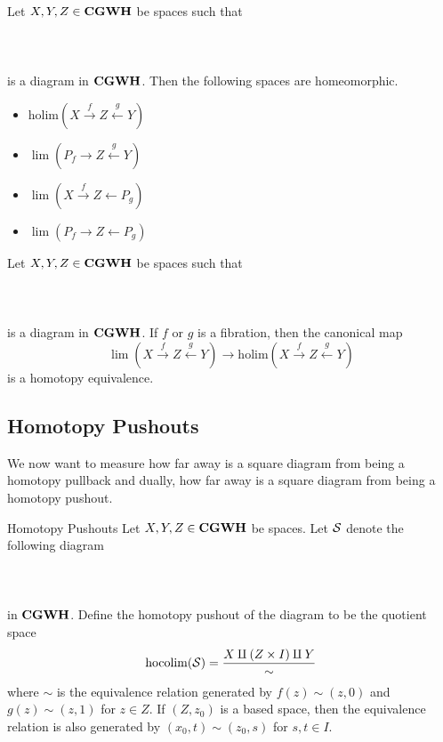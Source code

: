 \documentclass[a4paper]{article}
\begin{document}
\begin{prp}{}{} Let $X,Y,Z\in\bold{CGWH}$ be spaces such that \\~\\
\\~\\
is a diagram in $\bold{CGWH}$. Then the following spaces are homeomorphic. 
\begin{itemize}
\item $\text{holim}(X\overset{f}{\rightarrow}Z\overset{g}{\leftarrow}Y)$
\item $\lim(P_f\rightarrow Z\overset{g}{\leftarrow}Y)$
\item $\lim(X\overset{f}{\rightarrow}Z\leftarrow P_g)$
\item $\lim(P_f\rightarrow Z\leftarrow P_g)$
\end{itemize}
\end{prp}

\begin{prp}{}{} Let $X,Y,Z\in\bold{CGWH}$ be spaces such that \\~\\
\\~\\
is a diagram in $\bold{CGWH}$. If $f$ or $g$ is a fibration, then the canonical map $$\lim(X\overset{f}{\rightarrow}Z\overset{g}{\leftarrow}Y)\to\text{holim}(X\overset{f}{\rightarrow}Z\overset{g}{\leftarrow}Y)$$ is a homotopy equivalence. 
\end{prp}

\subsection{Homotopy Pushouts}
We now want to measure how far away is a square diagram from being a homotopy pullback and dually, how far away is a square diagram from being a homotopy pushout. 

\begin{defn}{Homotopy Pushouts}{} Let $X,Y,Z\in\bold{CGWH}$ be spaces. Let $\mathcal{S}$ denote the following diagram \\~\\
\\~\\
in $\bold{CGWH}$. Define the homotopy pushout of the diagram to be the quotient space $$\operatorname*{hocolim}(\mathcal{S})=\frac{X\amalg(Z\times I)\amalg Y}{\sim}$$ where $\sim$ is the equivalence relation generated by $f(z)\sim (z,0)$ and $g(z)\sim(z,1)$ for $z\in Z$. If $(Z,z_0)$ is a based space, then the equivalence relation is also generated by $(x_0,t)\sim(z_0,s)$ for $s,t\in I$. 
\end{defn}
\end{document}
